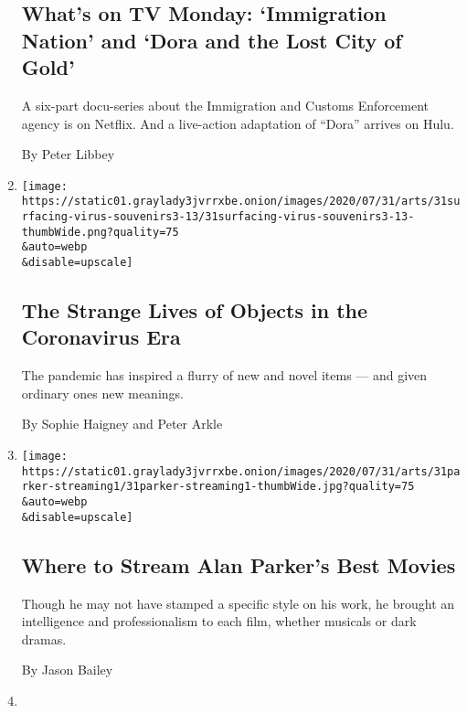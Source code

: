 \begin{enumerate}
{  \subsection{What's on TV Monday: `Immigration Nation' and `Dora and
  the Lost City of
  Gold'}\label{whats-on-tv-monday-immigration-nation-and-dora-and-the-lost-city-of-gold}}

  A six-part docu-series about the Immigration and Customs Enforcement
  agency is on Netflix. And a live-action adaptation of ``Dora'' arrives
  on Hulu.

  By Peter Libbey
\item
  \href{/2020/08/01/arts/design/virus-design-objects.html}{}

  \texttt{[image: https://static01.graylady3jvrrxbe.onion/images/2020/07/31/arts/31surfacing-virus-souvenirs3-13/31surfacing-virus-souvenirs3-13-thumbWide.png?quality=75\\\&auto=webp\\\&disable=upscale]}

  \hypertarget{the-strange-lives-of-objects-in-the-coronavirus-era}{%
  \subsection{The Strange Lives of Objects in the Coronavirus
  Era}\label{the-strange-lives-of-objects-in-the-coronavirus-era}}

  The pandemic has inspired a flurry of new and novel items --- and
  given ordinary ones new meanings.

  By Sophie Haigney and Peter Arkle
\item
  \href{/2020/07/31/movies/alan-parker-stream.html}{}

  \texttt{[image: https://static01.graylady3jvrrxbe.onion/images/2020/07/31/arts/31parker-streaming1/31parker-streaming1-thumbWide.jpg?quality=75\\\&auto=webp\\\&disable=upscale]}

  \hypertarget{where-to-stream-alan-parkers-best-movies}{%
  \subsection{Where to Stream Alan Parker's Best
  Movies}\label{where-to-stream-alan-parkers-best-movies}}

  Though he may not have stamped a specific style on his work, he
  brought an intelligence and professionalism to each film, whether
  musicals or dark dramas.

  By Jason Bailey
\item
  \href{/2020/07/31/movies/shakuntala-devi-movie.html}{}


\end{enumerate}

